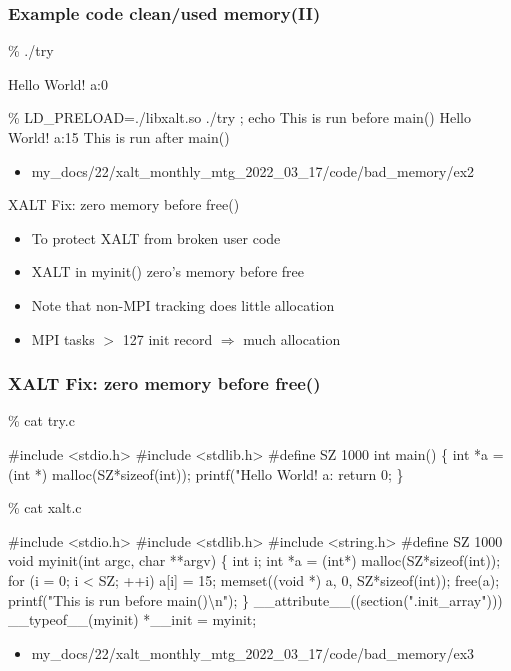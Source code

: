 \documentclass{beamer}
\begin{document}
\begin{frame}[fragile]
    \frametitle{Example code clean/used memory(II)}
 {\small
   \begin{semiverbatim}
\% ./try

Hello World! {\color{blue} a:0}

\% LD_PRELOAD=./libxalt.so  ./try  ; echo
This is run before main()
Hello World! {\color{red} a:15}
This is run after main()
    \end{semiverbatim}
}
  \begin{itemize}
    \item my\_docs/22/xalt\_monthly\_mtg\_2022\_03\_17/code/bad\_memory/ex2
  \end{itemize}
\end{frame}

\begin{frame}{XALT Fix: zero memory before free()}
  \begin{itemize}
    \item To protect XALT from broken user code
    \item XALT in myinit() zero's memory before free
    \item Note that non-MPI tracking does little allocation
    \item MPI tasks $>$ 127 init record $\Rightarrow$ much allocation
  \end{itemize}
\end{frame}



\begin{frame}[fragile]
    \frametitle{XALT Fix: zero memory before free()}
 {\tiny
    \begin{semiverbatim}
\% cat try.c

#include <stdio.h>
#include <stdlib.h>
#define SZ 1000
int main()
\{
  int *a = (int *) malloc(SZ*sizeof(int));
  printf("Hello World! a:%
  return 0;
\}

\% cat xalt.c

#include <stdio.h>
#include <stdlib.h>
#include <string.h>
#define SZ 1000
void myinit(int argc, char **argv)
\{
  int i;
  int *a = (int*) malloc(SZ*sizeof(int));
  for (i = 0; i < SZ; ++i) a[i] = 15; 
  {\color{blue}{}memset((void *) a, 0, SZ*sizeof(int))};
  free(a);
  printf("This is run before main()\textbackslash{}n");
\}
__attribute__((section(".init_array"))) __typeof__(myinit) *__init = myinit;
    \end{semiverbatim}
}

  \begin{itemize}
    \item my\_docs/22/xalt\_monthly\_mtg\_2022\_03\_17/code/bad\_memory/ex3
  \end{itemize}
\end{frame}
\end{document}
